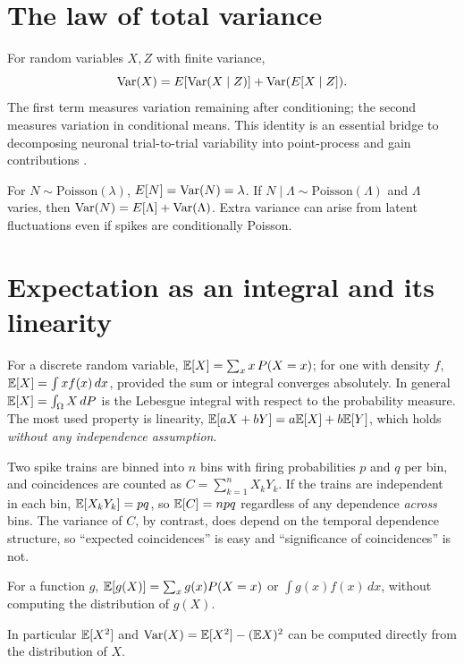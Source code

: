 \section{The law of total variance}
For random variables $X,Z$ with finite variance,
\[\operatorname{Var}(X)=E[\operatorname{Var}(X\mid Z)]+\operatorname{Var}(E[X\mid Z]).\]
The first term measures variation remaining after conditioning; the second measures variation in conditional means. This identity is an essential bridge to decomposing neuronal trial-to-trial variability into point-process and gain contributions \cite{Goris2014}.

\begin{workedexample}
For $N\sim\mathrm{Poisson}(\lambda)$, $E[N]=\operatorname{Var}(N)=\lambda$. If $N\mid\Lambda\sim\mathrm{Poisson}(\Lambda)$ and $\Lambda$ varies, then $\operatorname{Var}(N)=E[\Lambda]+\operatorname{Var}(\Lambda)$. Extra variance can arise from latent fluctuations even if spikes are conditionally Poisson.
\end{workedexample}
\section{Expectation as an integral and its linearity}
For a discrete random variable, $\mathbb E[X]=\sum_xx\,P(X=x)$; for one with density $f$, $\mathbb E[X]=\int xf(x)\,dx$, provided the sum or integral converges absolutely. In general $\mathbb E[X]=\int_\Omega X\,dP$ is the Lebesgue integral with respect to the probability measure. The most used property is linearity, $\mathbb E[aX+bY]=a\mathbb E[X]+b\mathbb E[Y]$, which holds \emph{without any independence assumption}.

\begin{workedexample}
Two spike trains are binned into $n$ bins with firing probabilities $p$ and $q$ per bin, and coincidences are counted as $C=\sum_{k=1}^nX_kY_k$. If the trains are independent in each bin, $\mathbb E[X_kY_k]=pq$, so $\mathbb E[C]=npq$ regardless of any dependence \emph{across} bins. The variance of $C$, by contrast, does depend on the temporal dependence structure, so ``expected coincidences'' is easy and ``significance of coincidences'' is not.
\end{workedexample}

\begin{proposition}
For a function $g$, $\mathbb E[g(X)]=\sum_xg(x)P(X=x)$ or $\int g(x)f(x)\,dx$, without computing the distribution of $g(X)$.
\end{proposition}
In particular $\mathbb E[X^2]$ and $\operatorname{Var}(X)=\mathbb E[X^2]-(\mathbb E X)^2$ can be computed directly from the distribution of $X$.

